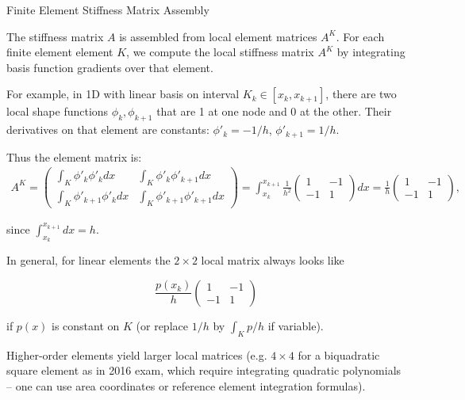 \documentclass[a4paper,11pt]{report}
\begin{document}
\begin{outline}{Finite Element Stiffness Matrix Assembly}{}

    The stiffness matrix $A$ is assembled from local element matrices $A^K$.
    For each finite element element $K$, we compute the local stiffness matrix $A^K$ by integrating basis function gradients over that element.

    For example, in 1D with linear basis on interval $K_k \in [x_k,x_{k+1}]$, there are two local shape functions $\phi_k,\phi_{k+1}$ that are 1 at one node and 0 at the other. Their derivatives on that element are constants: $\phi'_k = -1/h$, $\phi'_{k+1}=1/h$.

    Thus the element matrix is:
    \begin{align*}
        A^K = \begin{pmatrix}
                  \int_K \phi'_k \phi'_kdx    & \int_K \phi'_k \phi'_{k+1}dx    \\[6pt]
                  \int_K \phi'_{k+1}\phi'_kdx & \int_K \phi'_{k+1}\phi'_{k+1}dx
              \end{pmatrix} = \int_{x_k}^{x_{k+1}}\frac{1}{h^2} \begin{pmatrix}1 & -1\\ -1 & 1\end{pmatrix} dx = \frac{1}{h}\begin{pmatrix}1 & -1\\ -1 & 1\end{pmatrix},
    \end{align*}

    since $\int_{x_k}^{x_{k+1}} dx = h$.

    In general, for linear elements the $2\times2$ local matrix always looks like

    $$
        \frac{p(x_k)}{h}\begin{pmatrix}1&-1\\-1&1\end{pmatrix}
    $$

    if $p(x)$ is constant on $K$ (or replace $1/h$ by $\int_K p/h$ if variable).

    Higher-order elements yield larger local matrices (e.g. $4\times4$ for a biquadratic square element as in 2016 exam, which require integrating quadratic polynomials -- one can use area coordinates or reference element integration formulas).


\end{outline}
\end{document}
